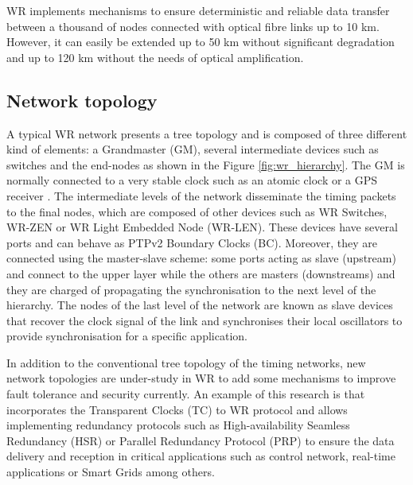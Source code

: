 WR implements mechanisms to ensure deterministic and reliable data transfer
between a thousand of nodes connected with  optical fibre links up to 10 km.
However, it can easily be extended up to 50 km without significant degradation
and up to 120 km without the needs of optical amplification. 

\subsection{Network topology} \label{subsec:wr-net}

A typical WR network presents a tree topology and is composed of three different
kind of elements: a Grandmaster (GM), several intermediate devices such as
switches and the end-nodes as shown in the Figure \ref{fig:wr_hierarchy}. The GM
is normally connected to a very stable clock such as an atomic clock or a GPS
receiver \cite{Daniluk2012}. The intermediate levels of the network disseminate
the timing packets to the final nodes, which are composed of other devices such
as WR Switches, WR-ZEN or WR Light Embedded Node (WR-LEN). These devices have
several ports and can behave as PTPv2 Boundary Clocks (BC). Moreover, they are
connected using the master-slave scheme: some ports acting as slave (upstream)
and connect to the upper layer while the others are masters (downstreams) and
they are charged of propagating the synchronisation to the next level of the
hierarchy. The nodes of the last level of the network are known as slave devices
that recover the clock signal of the link and synchronises their local
oscillators to provide synchronisation for a specific application.

In addition to the conventional tree topology of the timing networks, new
network topologies are under-study in WR to add some mechanisms to improve fault
tolerance and security currently. An example of this research is
\cite{jlgutierrez-paper-redundancy} that incorporates the Transparent Clocks
(TC) to WR protocol and allows implementing redundancy protocols such as
High-availability Seamless Redundancy (HSR) or Parallel Redundancy Protocol
(PRP) to ensure the data delivery and reception in critical applications such as
control network, real-time applications or Smart Grids among others.

